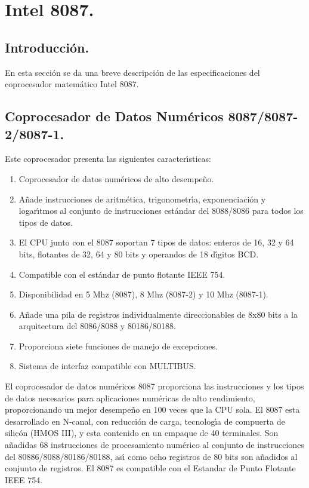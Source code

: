 \section{Intel 8087.}
\label{Section:8087}


\subsection{Introducci\'on.}
\label{Subsection:intro8087}

En esta secci\'on se da una breve descripci\'on de las especificaciones del coprocesador %
matem\'atico Intel 8087.


\subsection{Coprocesador de Datos Num\'ericos 8087/8087-2/8087-1.} 
\label{Subsection:copro8087}

Este coprocesador presenta las siguientes caracter\'{\i}sticas:

\begin{enumerate}
\item Coprocesador de datos num\'ericos de alto desempe\~no.
\item A\~nade instrucciones de aritm\'etica, trigonometr\'{\i}a, exponenciaci\'on y %
logar\'{\i}tmos al conjunto de instrucciones est\'andar del 8088/8086 para todos los tipos de %
datos.
\item El CPU junto con el 8087 soportan 7 tipos de datos: enteros de 16, 32 y 64 bits, flotantes %
de 32, 64 y 80 bits y operandos de 18 d\'{\i}gitos BCD.
\item Compatible con el est\'andar de punto flotante IEEE 754.
\item Disponibilidad en 5 Mhz (8087), 8 Mhz (8087-2) y 10 Mhz (8087-1).
\item A\~nade una pila de registros individualmente direccionables de 8x80 bits a la %
arquitectura del 8086/8088 y 80186/80188.
\item Proporciona siete funciones de manejo de excepciones.
\item Sistema de interfaz compatible con MULTIBUS.
\end{enumerate}

El coprocesador de datos num\'ericos 8087 proporciona las instrucciones y los tipos de datos %
necesarios para aplicaciones num\'ericas de alto rendimiento, proporcionando un mejor %
desempe\~no en 100 veces que la CPU sola. El 8087 esta desarrollado en N-canal, con reducci\'on %
de carga, tecnolog\'{\i}a de compuerta de silic\'on (HMOS III), y esta contenido en un empaque %
de 40 terminales. Son a\~nadidas 68 instrucciones de procesamiento num\'erico al conjunto de %
instrucciones del 80886/8088/80186/80188, as\'{\i} como ocho registros de 80 bits son %
a\~nadidos al conjunto de registros. El 8087 es compatible con el Estandar de Punto Flotante IEEE %
754.

